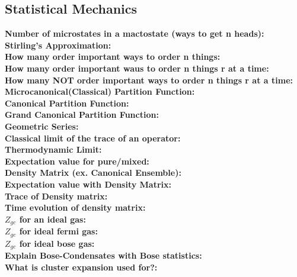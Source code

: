 \documentclass[12pt]{extarticle}
\begin{document}
\subsection{Statistical Mechanics}
\textbf{Number of microstates in a mactostate (ways to get n heads):} \\
\textbf{Stirling's Approximation:} \\
\textbf{How many order important ways to order n things:} \\
\textbf{How many order important waus to order n things r at a time:} \\
\textbf{How many NOT order important ways to order n things r at a time:} \\
\textbf{Microcanonical(Classical) Partition Function:} \\
\textbf{Canonical Partition Function:} \\
\textbf{Grand Canonical Partition Function:} \\
\textbf{Geometric Series:} \\
\textbf{Classical limit of the trace of an operator:} \\
\textbf{Thermodynamic Limit:} \\
\textbf{Expectation value for pure/mixed:} \\
\textbf{Density Matrix (ex. Canonical Ensemble):} \\
\textbf{Expectation value with Density Matrix:} \\
\textbf{Trace of Density matrix:} \\
\textbf{Time evolution of density matrix:} \\
\textbf{$Z_{gc}$ for an ideal gas:} \\
\textbf{$Z_{gc}$ for ideal fermi gas:} \\
\textbf{$Z_{gc}$ for ideal bose gas:} \\
\textbf{Explain Bose-Condensates with Bose statistics:} \\
\textbf{What is cluster expansion used for?:} \\
\end{document}
